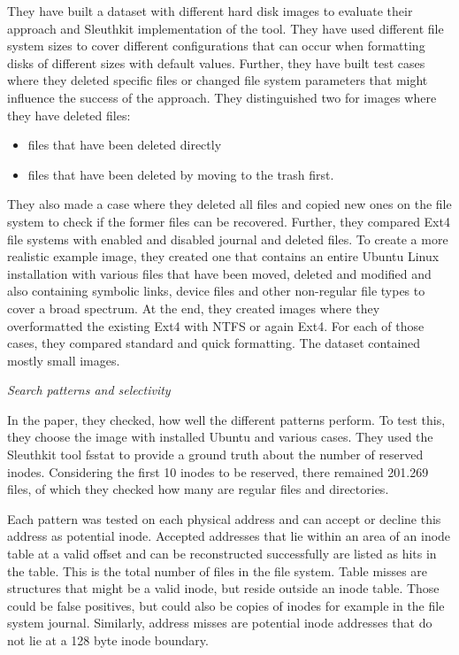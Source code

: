 \documentclass{acm_proc_article-sp}
\begin{document}
They have built a dataset with different hard disk images to evaluate their approach and Sleuthkit implementation of the tool. They have used different file system sizes to cover different configurations that can occur when formatting disks of different sizes with default values. 
Further, they have built test cases where they deleted specific files or changed file system parameters that might influence the success of the approach.
They distinguished two for images where they have deleted files:
\begin{itemize}
\item files that have been deleted directly
\item files that have been deleted by moving to the trash first.
\end{itemize}
They also made a case where they deleted all files and copied new ones on the file system to check if the former files can be recovered.
Further, they compared Ext4 file systems with enabled and
disabled journal and deleted files. To create a more realistic
example image, they created one that contains an entire Ubuntu
Linux installation with various files that have been moved, deleted
and modified and also containing symbolic links, device files and
other non-regular file types to cover a broad spectrum.
At the end, they created images where they overformatted the existing Ext4 with NTFS or again Ext4. For each of those cases, they compared standard and quick formatting. The dataset contained mostly small images.

\textit{Search patterns and selectivity}

In the paper, they checked, how well the different patterns perform. 
To test this, they choose the image with installed Ubuntu and various cases. They used the Sleuthkit tool fsstat to provide a ground truth about the number of reserved inodes.
Considering the first 10 inodes to be reserved, there remained 201.269 files, of which they checked how many are regular files and directories.

Each pattern was tested on each physical address and can accept or decline this address as potential inode. Accepted addresses that lie within an area of an inode table at a valid offset and can be reconstructed successfully are listed as hits in the table. This is the total number of files in the file system. Table misses are structures that might be a valid inode, but reside outside an inode table. Those could be false positives, but could also be copies of inodes for example in the file system journal. Similarly, address misses are potential inode addresses that do not lie at a 128 byte inode boundary.
\end{document}
